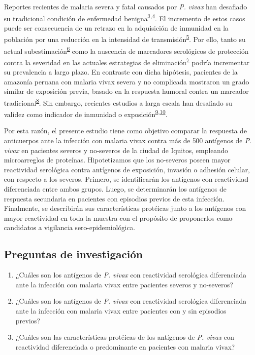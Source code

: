 \documentclass[]{article}
\begin{document}
Reportes recientes de malaria severa y fatal causados por \emph{P.
vivax} han desafiado su tradicional condición de enfermedad
benigna\textsuperscript{\protect\hyperlink{ref-baird2009}{3},\protect\hyperlink{ref-quispe2014}{4}}.
El incremento de estos casos puede ser consecuencia de un retrazo en la
adquisición de inmunidad en la población por una reducción en la
intensidad de
transmisión\textsuperscript{\protect\hyperlink{ref-reyburn2015}{5}}. Por
ello, tanto su actual
subestimación\textsuperscript{\protect\hyperlink{ref-norma2001}{6}} como
la auscencia de marcadores serológicos de protección contra la severidad
en las actuales estrategias de
eliminación\textsuperscript{\protect\hyperlink{ref-accelerate2016}{7}}
podría incrementar su prevalencia a largo plazo. En contraste con dicha
hipótesis, pacientes de la amazonía peruana con malaria vivax severa y
no complicada mostraron un grado similar de exposición previa, basado en
la respuesta humoral contra un marcador
tradicional\textsuperscript{\protect\hyperlink{ref-baldevi2013}{8}}. Sin
embargo, recientes estudios a larga escala han desafiado su validez como
indicador de inmunidad o
exposición\textsuperscript{\protect\hyperlink{ref-crompton2010}{9},\protect\hyperlink{ref-Helb2015exposure}{10}}.

Por esta razón, el presente estudio tiene como objetivo comparar la
respuesta de anticuerpos ante la infección con malaria vivax contra más
de 500 antígenos de \emph{P. vivax} en pacientes severos y no-severos de
la ciudad de Iquitos, empleando microarreglos de proteínas.
Hipotetizamos que los no-severos poseen mayor reactividad serológica
contra antígenos de exposición, invasión o adhesión celular, con
respecto a los severos. Primero, se identificarán los antígenos con
reactividad diferenciada entre ambos grupos. Luego, se determinarán los
antígenos de respuesta secundaria en pacientes con episodios previos de
esta infección. Finalmente, se describirán sus características protéicas
junto a los antígenos con mayor reactividad en toda la muestra con el
propósito de proponerlos como candidatos a vigilancia
sero-epidemiológica.

\subsection{Preguntas de
investigación}\label{preguntas-de-investigacion}

\begin{enumerate}
\def\labelenumi{\arabic{enumi}.}
\item
  ¿Cuáles son los antígenos de \emph{P. vivax} con reactividad
  serológica diferenciada ante la infección con malaria vivax entre
  pacientes severos y no-severos?
\item
  ¿Cuáles son los antígenos de \emph{P. vivax} con reactividad
  serológica diferenciada ante la infección con malaria vivax entre
  pacientes con y sin episodios previos?
\item
  ¿Cuáles son las características protéicas de los antígenos de \emph{P.
  vivax} con reactividad diferenciada o predominante en pacientes con
  malaria vivax?
\end{enumerate}
\end{document}
